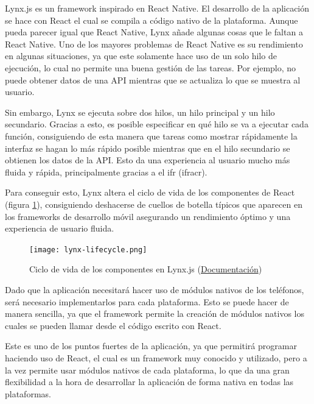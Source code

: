 Lynx.js es un framework inspirado en React Native. El desarrollo de la aplicación se hace con React el cual se compila a código nativo de la plataforma.
Aunque pueda parecer igual que React Native, Lynx añade algunas cosas que le faltan a React Native. Uno de los mayores problemas de React Native es su rendimiento en algunas situaciones, ya que este solamente hace uso de un solo hilo de ejecución, lo cual no permite una buena gestión de las tareas. Por ejemplo, no puede obtener datos de una API mientras que se actualiza lo que se muestra al usuario.

Sin embargo, Lynx se ejecuta sobre dos hilos, un hilo principal y un hilo secundario.
Gracias a esto, es posible especificar en qué hilo se va a ejecutar cada función, consiguiendo de esta manera que tareas como mostrar rápidamente la interfaz se hagan lo más rápido posible mientras que en el hilo secundario se obtienen los datos de la API.
Esto da una experiencia al usuario mucho más fluida y rápida, principalmente gracias a el \gls{ifr} (\acrshort{ifracr}).

Para conseguir esto, Lynx altera el ciclo de vida de los componentes de React (figura \ref{fig:lynx-component-lifecycle}), consiguiendo deshacerse de cuellos de botella típicos que aparecen en los frameworks de desarrollo móvil asegurando un rendimiento óptimo y una experiencia de usuario fluida.

\begin{figure}[h]
    \begin{center}
        \texttt{[image: lynx-lifecycle.png]}
    \end{center}
    \caption{Ciclo de vida de los componentes en Lynx.js (\href{https://lynxjs.org/react/lifecycle.html}{Documentación})}
    \label{fig:lynx-component-lifecycle}
\end{figure}


Dado que la aplicación necesitará hacer uso de módulos nativos de los teléfonos, será necesario implementarlos para cada plataforma.
Esto se puede hacer de manera sencilla, ya que el framework permite la creación de módulos nativos los cuales se pueden llamar desde el código escrito con React.

Este es uno de los puntos fuertes de la aplicación, ya que permitirá programar haciendo uso de React, el cual es un framework muy conocido y utilizado, pero a la vez permite usar módulos nativos de cada plataforma, lo que da una gran flexibilidad a la hora de desarrollar la aplicación de forma nativa en todas las plataformas.

